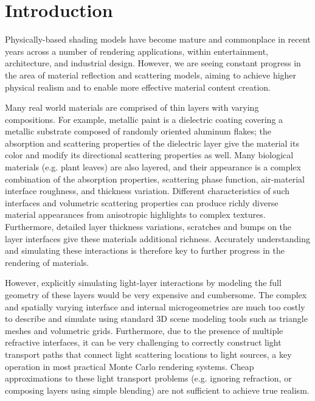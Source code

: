 \section{Introduction}
\label{sec:layeredbsdf:intro}

Physically-based shading models have become mature and commonplace in recent years across a number of rendering applications, within entertainment, architecture, and industrial design. 
However, we are seeing constant progress in the area of material reflection and scattering models, aiming to achieve higher physical realism and to enable more effective material content creation.

Many real world materials are comprised of thin layers with varying compositions. For example, metallic paint is a dielectric coating covering a metallic substrate composed of randomly oriented aluminum flakes; the absorption and scattering properties of the dielectric layer give the material its color and modify its directional scattering properties as well.
Many biological materials (e.g. plant leaves) are also layered, and their appearance is a complex combination of the absorption properties, scattering phase function, air-material interface roughness, and thickness variation.
Different characteristics of such interfaces and volumetric scattering properties can produce richly diverse material appearances from anisotropic highlights to complex textures. Furthermore, detailed layer thickness variations, scratches and bumps on the layer interfaces give these materials additional richness. Accurately understanding and simulating these interactions is therefore key to further progress in the rendering of materials.



However, explicitly simulating light-layer interactions by modeling the full geometry of these layers would be very expensive and cumbersome. 
The complex and spatially varying interface and internal microgeometries are much too costly to describe and simulate using standard 3D scene modeling tools such as triangle meshes and volumetric grids.
Furthermore, due to the presence of multiple refractive interfaces, it can be very challenging to correctly construct light transport paths that connect light scattering locations to light sources, a key operation in most practical Monte Carlo rendering systems. Cheap approximations to these light transport problems (e.g. ignoring refraction, or composing layers using simple blending) are not sufficient to achieve true realism.

